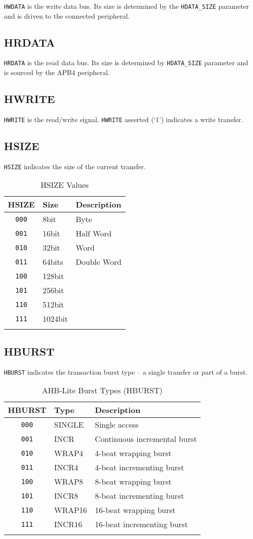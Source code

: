 \texttt{HWDATA} is the write data bus. Its size is determined by the \texttt{HDATA\_SIZE}
parameter and is driven to the connected peripheral.

\subsection{HRDATA}\label{hrdata}

\texttt{HRDATA} is the read data bus. Its size is determined by \texttt{HDATA\_SIZE}
parameter and is sourced by the APB4 peripheral.

\subsection{HWRITE}\label{hwrite}

\texttt{HWRITE} is the read/write signal. \texttt{HWRITE} asserted (`1') indicates a write
transfer.

\subsection{HSIZE}\label{hsize}

\texttt{HSIZE} indicates the size of the current transfer.

\begin{longtable}[]{@{}cll@{}}
	\toprule
	HSIZE & Size & Description\tabularnewline
	\midrule
	\endhead
	\texttt{000} & 8bit & Byte\tabularnewline
	\texttt{001} & 16bit & Half Word\tabularnewline
	\texttt{010} & 32bit & Word\tabularnewline
	\texttt{011} & 64bits & Double Word\tabularnewline
	\texttt{100} & 128bit &\tabularnewline
	\texttt{101} & 256bit &\tabularnewline
	\texttt{110} & 512bit &\tabularnewline
	\texttt{111} & 1024bit &\tabularnewline
	\bottomrule
	\caption{HSIZE Values}
\end{longtable}

\subsection{HBURST}\label{hburst}

\texttt{HBURST} indicates the transaction burst type -- a single transfer or part
of a burst.

\begin{longtable}[]{@{}cll@{}}
	\toprule
		HBURST & Type & Description\tabularnewline
	\midrule
	\endhead
		\texttt{000} & SINGLE & Single access\tabularnewline
		\texttt{001} & INCR   & Continuous incremental burst\tabularnewline
		\texttt{010} & WRAP4  & 4-beat wrapping burst\tabularnewline
		\texttt{011} & INCR4  & 4-beat incrementing burst\tabularnewline
		\texttt{100} & WRAP8  & 8-beat wrapping burst\tabularnewline
		\texttt{101} & INCR8  & 8-beat incrementing burst\tabularnewline
		\texttt{110} & WRAP16 & 16-beat wrapping burst\tabularnewline
		\texttt{111} & INCR16 & 16-beat incrementing burst\tabularnewline
	\bottomrule
	\caption{AHB-Lite Burst Types (HBURST)}
\end{longtable}

